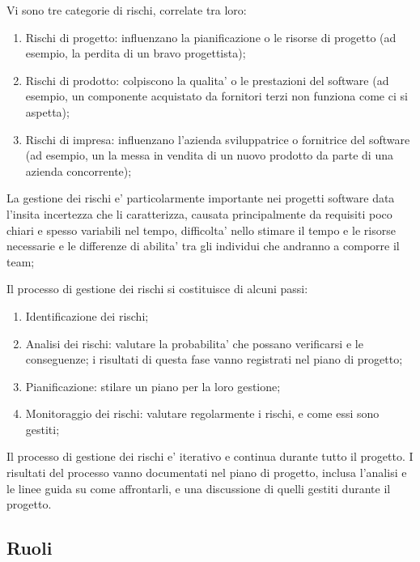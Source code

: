 Vi sono tre categorie di rischi, correlate tra loro:

\begin{enumerate}
  \item Rischi di progetto: influenzano la pianificazione o le risorse di
    progetto (ad esempio, la perdita di un bravo progettista);
  \item Rischi di prodotto: colpiscono la qualita' o le prestazioni del software
    (ad esempio, un componente acquistato da fornitori terzi non funziona come
    ci si aspetta);
  \item Rischi di impresa: influenzano l'azienda sviluppatrice o fornitrice del
    software (ad esempio, un la messa in vendita di un nuovo prodotto da parte
    di una azienda concorrente);
\end{enumerate}

La gestione dei rischi e' particolarmente importante nei progetti software data
l'insita incertezza che li caratterizza, causata principalmente da requisiti
poco chiari e spesso variabili nel tempo, difficolta' nello stimare il tempo e
le risorse necessarie e le differenze di abilita' tra gli individui che andranno
a comporre il team;

Il processo di gestione dei rischi si costituisce di alcuni passi:

\begin{enumerate}
  \item Identificazione dei rischi;
  \item Analisi dei rischi: valutare la probabilita' che possano verificarsi e
    le conseguenze; i risultati di questa fase vanno registrati nel piano di
    progetto;
  \item Pianificazione: stilare un piano per la loro gestione;
  \item Monitoraggio dei rischi: valutare regolarmente i rischi, e come essi
    sono gestiti;
\end{enumerate}

Il processo di gestione dei rischi e' iterativo e continua durante tutto il
progetto. I risultati del processo vanno documentati nel piano di progetto,
inclusa l'analisi e le linee guida su come affrontarli, e una discussione di
quelli gestiti durante il progetto.

\subsection{Ruoli}


